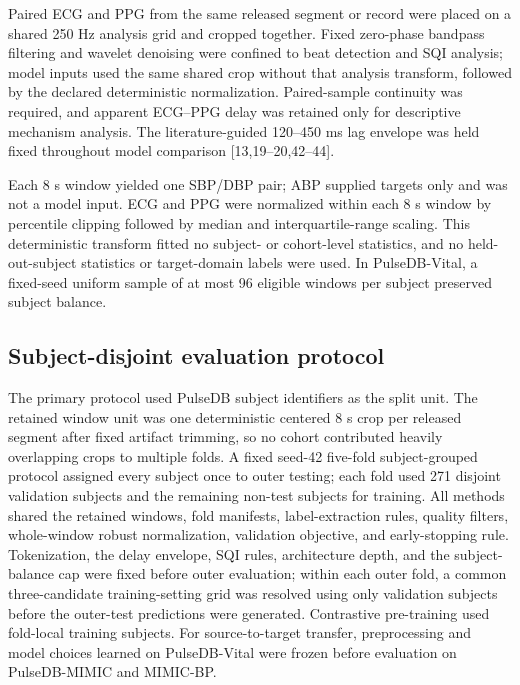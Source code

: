 \documentclass[preprint,12pt]{elsarticle}
\begin{document}
Paired ECG and PPG from the same released segment or record were placed on a shared 250 Hz analysis grid and cropped together. Fixed zero-phase bandpass filtering and wavelet denoising were confined to beat detection and SQI analysis; model inputs used the same shared crop without that analysis transform, followed by the declared deterministic normalization. Paired-sample continuity was required, and apparent ECG--PPG delay was retained only for descriptive mechanism analysis. The literature-guided 120--450 ms lag envelope was held fixed throughout model comparison [13,19--20,42--44].

Each 8 s window yielded one SBP/DBP pair; ABP supplied targets only and was not a model input. ECG and PPG were normalized within each 8 s window by percentile clipping followed by median and interquartile-range scaling. This deterministic transform fitted no subject- or cohort-level statistics, and no held-out-subject statistics or target-domain labels were used. In PulseDB-Vital, a fixed-seed uniform sample of at most 96 eligible windows per subject preserved subject balance.

\subsection{Subject-disjoint evaluation protocol}
\label{sec:protocol_integrity}

The primary protocol used PulseDB subject identifiers as the split unit. The retained window unit was one deterministic centered 8 s crop per released segment after fixed artifact trimming, so no cohort contributed heavily overlapping crops to multiple folds. A fixed seed-42 five-fold subject-grouped protocol assigned every subject once to outer testing; each fold used 271 disjoint validation subjects and the remaining non-test subjects for training. All methods shared the retained windows, fold manifests, label-extraction rules, quality filters, whole-window robust normalization, validation objective, and early-stopping rule. Tokenization, the delay envelope, SQI rules, architecture depth, and the subject-balance cap were fixed before outer evaluation; within each outer fold, a common three-candidate training-setting grid was resolved using only validation subjects before the outer-test predictions were generated. Contrastive pre-training used fold-local training subjects. For source-to-target transfer, preprocessing and model choices learned on PulseDB-Vital were frozen before evaluation on PulseDB-MIMIC and MIMIC-BP.
\end{document}
